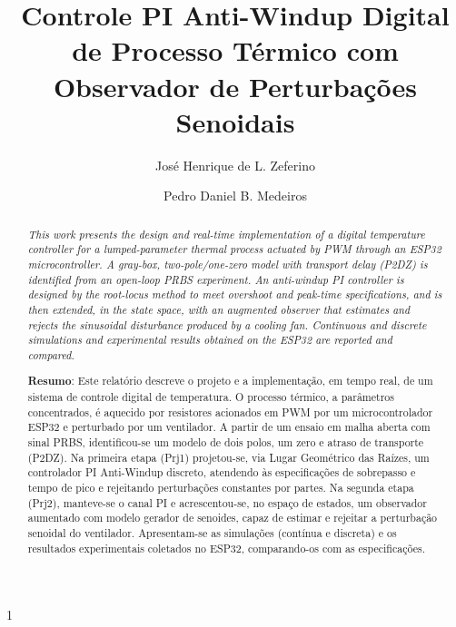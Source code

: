 \documentclass[a4paper]{ifacconf}
\def\portugues{1}
\def\portugues{0}
\begin{document}
\if\portugues1


\begin{frontmatter}


\title{Controle PI Anti-Windup Digital de Processo Térmico com Observador de Perturbações Senoidais}




\author[First]{José Henrique de L. Zeferino}
\author[Second]{Pedro Daniel B. Medeiros}

\address[First]{190125985, Engenharia Mecatrônica, UnB, jh.delucas@gmail.com}
\address[Second]{202028759, Engenharia Mecatrônica, pedrobomtempo2001@gmail.com}


\renewcommand{\abstractname}{{\bf Abstract:~}}
\begin{abstract}                %
\textit{This work presents the design and real-time implementation of a digital temperature controller for a lumped-parameter thermal process actuated by PWM through an ESP32 micro\-controller. A gray-box, two-pole/one-zero model with transport delay (P2DZ) is identified from an open-loop PRBS experiment. An anti-windup PI controller is designed by the root-locus method to meet overshoot and peak-time specifications, and is then extended, in the state space, with an augmented observer that estimates and rejects the sinusoidal disturbance produced by a cooling fan. Continuous and discrete simulations and experimental results obtained on the ESP32 are reported and compared.}

\vskip 1mm%
{\noindent \bf Resumo}: Este relatório descreve o projeto e a implementação, em tempo real, de um sistema de controle digital de temperatura. O processo térmico, a parâmetros concentrados, é aquecido por resistores acionados em PWM por um microcontrolador ESP32 e perturbado por um ventilador. A partir de um ensaio em malha aberta com sinal PRBS, identificou-se um modelo de dois polos, um zero e atraso de transporte (P2DZ). Na primeira etapa (Prj1) projetou-se, via Lugar Geométrico das Raízes, um controlador PI Anti-Windup discreto, atendendo às especificações de sobrepasso e tempo de pico e rejeitando perturbações constantes por partes. Na segunda etapa (Prj2), manteve-se o canal PI e acrescentou-se, no espaço de estados, um observador aumentado com modelo gerador de senoides, capaz de estimar e rejeitar a perturbação senoidal do ventilador. Apresentam-se as simulações (contínua e discreta) e os resultados experimentais coletados no ESP32, comparando-os com as especificações.
\end{abstract}


\end{frontmatter}
\end{document}

